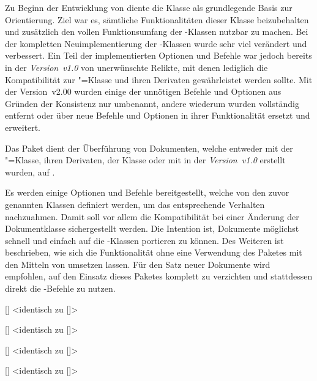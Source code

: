 \begin{DeclareEntity}{}
Zu Beginn der Entwicklung von \TUDScript diente die Klasse  als 
grundlegende Basis zur Orientierung. Ziel war es, sämtliche Funktionalitäten 
dieser Klasse beizubehalten und zusätzlich den vollen Funktionsumfang der 
\KOMAScript-Klassen nutzbar zu machen. Bei der kompletten Neuimplementierung 
der \TUDScript-Klassen wurde sehr viel verändert und verbessert. Ein Teil der 
implementierten Optionen und Befehle war jedoch bereits in der 
\emph{Version~v1.0} von \TUDScript unerwünschte Relikte, mit denen lediglich 
die Kompatibilität zur "=Klasse und ihren Derivaten 
gewährleistet werden sollte. Mit der Version~v2.00 wurden einige der unnötigen 
Befehle und Optionen aus Gründen der Konsistenz nur umbenannt, andere wiederum 
wurden vollständig entfernt oder über neue Befehle und Optionen in ihrer 
Funktionalität ersetzt und erweitert. 

Das Paket  dient der Überführung von Dokumenten, welche
entweder mit der "=Klasse, ihren Derivaten, 
der Klasse  oder mit \TUDScript in der \emph{Version~v1.0} 
erstellt wurden, auf \vTUDScript{\TUDScript}. 

Es werden einige Optionen und Befehle bereitgestellt, welche von den zuvor 
genannten Klassen definiert werden, um das entsprechende Verhalten nachzuahmen. 
Damit soll vor allem die Kompatibilität bei einer Änderung der Dokumentklasse 
sichergestellt werden. Die Intention ist, Dokumente möglichst schnell und 
einfach auf die \TUDScript-Klassen portieren zu können. Des Weiteren ist 
beschrieben, wie sich die Funktionalität ohne eine Verwendung des Paketes 
 mit den Mitteln von \TUDScript umsetzen lassen. Für den 
Satz neuer Dokumente wird empfohlen, auf den Einsatz dieses Paketes komplett zu 
verzichten und stattdessen direkt die \TUDScript-Befehle zu nutzen.

\begin{Declaration}
  {[]}
  <identisch zu []>
\begin{Declaration}
  {[]}
  <identisch zu []>
\begin{Declaration}
  {[]}
  <identisch zu []>
\begin{Declaration}
  {[]}
  <identisch zu []>
\printdeclarationlist


\end{Declaration}
\end{Declaration}
\end{Declaration}
\end{Declaration}
\end{DeclareEntity}
